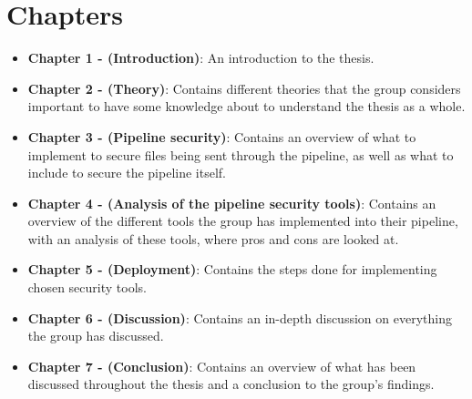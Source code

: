 \section{Chapters}
\begin{itemize}
    \item \textbf{Chapter 1 - (Introduction)}: An introduction to the thesis.
    \item \textbf{Chapter 2 - (Theory)}: Contains different theories that the group considers important 
    to have some knowledge about to understand the thesis as a whole.
    \item \textbf{Chapter 3 - (Pipeline security)}: Contains an overview of what to implement to secure files being sent through the pipeline, as well as what to include to secure the pipeline itself. 
    \item \textbf{Chapter 4 - (Analysis of the pipeline security tools)}: Contains an overview of the different tools the group has implemented into their pipeline, with an analysis of these tools, where pros and cons are looked at. 
    \item \textbf{Chapter 5 - (Deployment)}: Contains the steps done for implementing chosen security tools. 
    \item \textbf{Chapter 6 - (Discussion)}: Contains an in-depth discussion on everything the group has discussed. 
    \item \textbf{Chapter 7 - (Conclusion)}: Contains an overview of what has been discussed throughout the thesis and a conclusion to the group's findings. 

\end{itemize}






